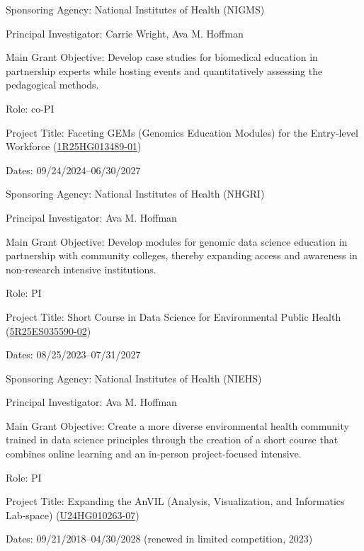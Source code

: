 \documentclass{cv}
\begin{document}
Sponsoring Agency: National Institutes of Health (NIGMS)

Principal Investigator: Carrie Wright, Ava M. Hoffman

Main Grant Objective: Develop case studies for biomedical education in partnership experts while hosting events and quantitatively assessing the pedagogical methods.

Role: co-PI

\vspace{5mm}

Project Title: Faceting GEMs (Genomics Education Modules) for the Entry-level Workforce (\href{https://reporter.nih.gov/search/pwbDP4bi2EGczoYgVimlTA/project-details/10854368}{1R25HG013489-01})

Dates: 09/24/2024--06/30/2027

Sponsoring Agency: National Institutes of Health (NHGRI)

Principal Investigator: Ava M. Hoffman

Main Grant Objective: Develop modules for genomic data science education in partnership with community colleges, thereby expanding access and awareness in non-research intensive institutions.

Role: PI

\vspace{5mm}

Project Title: Short Course in Data Science for Environmental Public Health (\href{https://reporter.nih.gov/search/n8pPuYzcskWEltb40MVBkA/project-details/10746327}{5R25ES035590-02})

Dates: 08/25/2023--07/31/2027

Sponsoring Agency: National Institutes of Health (NIEHS)

Principal Investigator: Ava M. Hoffman

Main Grant Objective: Create a more diverse environmental health community trained in data science principles through the creation of a short course that combines online learning and an in-person project-focused intensive.

Role: PI

\vspace{5mm}

Project Title: Expanding the AnVIL (Analysis, Visualization, and Informatics Lab-space) (\href{https://reporter.nih.gov/search/n8pPuYzcskWEltb40MVBkA/project-details/10748042}{U24HG010263-07})

Dates: 09/21/2018--04/30/2028 (renewed in limited competition, 2023)
\end{document}
